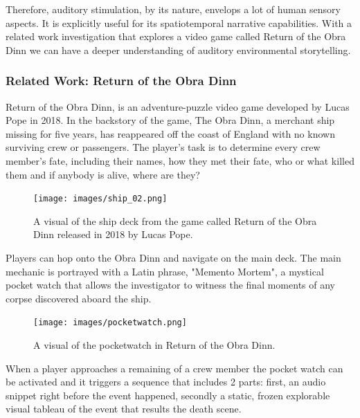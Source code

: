             Therefore, auditory stimulation, by its nature, envelops a lot of human sensory aspects. It is explicitly useful for its spatiotemporal narrative capabilities. With a related work investigation that explores a video game called Return of the Obra Dinn we can have a deeper understanding of auditory environmental storytelling.\par
        \subsubsection{Related Work: Return of the Obra Dinn}
            Return of the Obra Dinn, is an adventure-puzzle video game developed by Lucas Pope in 2018. In the backstory of the game, The Obra Dinn, a merchant ship missing for five years, has reappeared off the coast of England with no known surviving crew or passengers. The player's task is to determine every crew member's fate, including their names, how they met their fate, who or what killed them and if anybody is alive, where are they?\par

            \begin{figure}[H]
                \centering
                \texttt{[image: images/ship\_02.png]}
                \caption{A visual of the ship deck from the game called Return of the Obra Dinn released in 2018 by Lucas Pope.}
                \label{fig:SHIP}
            \end{figure}

            Players can hop onto the Obra Dinn and navigate on the main deck. The main mechanic is portrayed with a Latin phrase, "Memento Mortem", a mystical pocket watch that allows the investigator to witness the final moments of any corpse discovered aboard the ship.\par 

            \begin{figure}[H]
                \centering
                \texttt{[image: images/pocketwatch.png]}
                \caption{A visual of the pocketwatch in Return of the Obra Dinn.}
                \label{fig:POCKETWATCH}
            \end{figure}

            When a player approaches a remaining of a crew member the pocket watch can be activated and it triggers a sequence that includes 2 parts: first, an audio snippet right before the event happened, secondly a static, frozen explorable visual tableau of the event that results the death scene.\par


